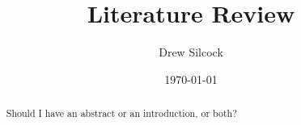 \documentclass[twocolumn,nobalancelastpage,prl,aps,10pt]{revtex4-1}
\begin{document}
\title{Literature Review}
\author{Drew Silcock}
\date{\today}

\begin{abstract}

    Should I have an abstract or an introduction, or both?

\end{abstract}

\maketitle









\nocite{*}


\end{document}
